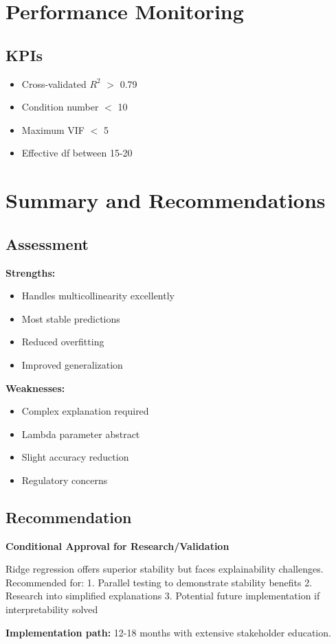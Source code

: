 \section{Performance Monitoring}

\subsection{KPIs}

\begin{itemize}
    \item Cross-validated $R^2$ $>$ 0.79
    \item Condition number $<$ 10
    \item Maximum VIF $<$ 5
    \item Effective df between 15-20
\end{itemize}

\section{Summary and Recommendations}

\subsection{Assessment}

\textbf{Strengths:}
\begin{itemize}
    \item Handles multicollinearity excellently
    \item Most stable predictions
    \item Reduced overfitting
    \item Improved generalization
\end{itemize}

\textbf{Weaknesses:}
\begin{itemize}
    \item Complex explanation required
    \item Lambda parameter abstract
    \item Slight accuracy reduction
    \item Regulatory concerns
\end{itemize}

\subsection{Recommendation}

\textbf{Conditional Approval for Research/Validation}

Ridge regression offers superior stability but faces explainability challenges. Recommended for:
1. Parallel testing to demonstrate stability benefits
2. Research into simplified explanations
3. Potential future implementation if interpretability solved

\textbf{Implementation path:} 12-18 months with extensive stakeholder education.
